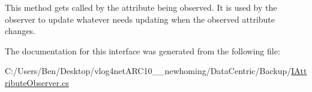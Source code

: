 This method gets called by the attribute being observed. It is used by the observer to update whatever needs updating when the observed attribute changes. 



The documentation for this interface was generated from the following file\-:\begin{DoxyCompactItemize}
\item 
C\-:/\-Users/\-Ben/\-Desktop/vlog4net\-A\-R\-C10\-\_\-\_\-newhoming/\-Data\-Centric/\-Backup/\hyperlink{_backup_2_i_attribute_observer_8cs}{I\-Attribute\-Observer.\-cs}\end{DoxyCompactItemize}
